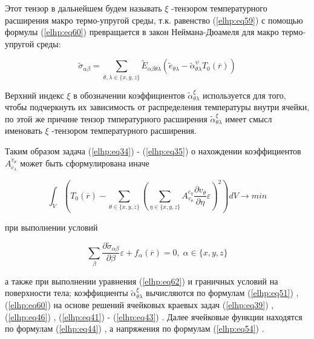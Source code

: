 Этот тензор в дальнейшем будем называть 
$\xi$
-тензором температурного расширения макро
термо-упругой среды, т.к. равенство 
(\ref{elhp:eq59})
с помощью формулы 
(\ref{elhp:eq60})
превращается в закон
Неймана-Дюамеля для макро термо-упругой среды:

\begin{equation}
    \label{elhp:eq62}
    \widetilde{\sigma}_{ \alpha\beta} =
    \sum_{ \theta,\lambda \in \{x,y,z\} }
    \widetilde{E}_{ \alpha\beta \theta\lambda}
    \left( 
    \widetilde{e}_{ \theta\lambda} -
    \widetilde{\alpha}_{ \theta\lambda}^{\psi} 
    T_0 \left( \overline{r}  \right) 
    \right) 
\end{equation}

Верхний индекс 
$\xi$
в обозначении коэффициентов 
$ \widetilde{\alpha}_{ \theta\lambda}^{\xi}$
используется для того, чтобы
подчеркнуть их зависимость от распределения температуры внутри ячейки, по этой же
причине тензор тмпературного расширения 
$ \widetilde{\alpha}_{ \theta\lambda}^{\xi}$
имеет смысл именовать 
$\xi$
-тензором
температурного расширения.

Таким образом задача 
(\ref{elhp:eq34})
-
(\ref{elhp:eq35})
о нахождении коэффициентов 
$ {A}_{ \overline{e}_{\lambda}}^{ v_{\theta}} $
может быть сформулирована иначе

\begin{equation}
    \label{elhp:eq63}
    \int_V
    \left( 
        T_0 \left( \overline{r}  \right) -
        \sum_{ \theta \in \{x,y,z\} }
        \left( 
            \sum_{ \eta \in \{x,y,z\} }
            A_{v_{\theta}}^{ \overline{e}_{\eta}}
            \frac{ \partial v_{\theta}}{ \partial \eta}
            \varepsilon
        \right)^2
    \right) 
    dV \rightarrow min
\end{equation}

при выполнении условий

\begin{equation}
    \label{elhp:eq64}
        \sum_{\beta} \frac{ \partial \widetilde{\sigma}_{ \alpha\beta}} { \partial \beta}
            \varepsilon + f_{\alpha} \left( \overline{r}  \right) = 0
            , \; \alpha \in \{x,y,z\}
\end{equation}

а также при выполнении уравнения 
(\ref{elhp:eq62})
и граничных условий на поверхности тела;
коэффициенты 
$ \widetilde{\alpha}_{ \theta\lambda}^{\xi}$
вычисляются по формулам 
(\ref{elhp:eq51})
, 
(\ref{elhp:eq60})
на основе решений ячейковых
краевых задач 
(\ref{elhp:eq39})
, 
(\ref{elhp:eq46})
, 
(\ref{elhp:eq41})
-
(\ref{elhp:eq43})
. Далее ячейковые функции находятся по формулам 
(\ref{elhp:eq44})
,
а напряжения по формулам 
(\ref{elhp:eq54})
.
